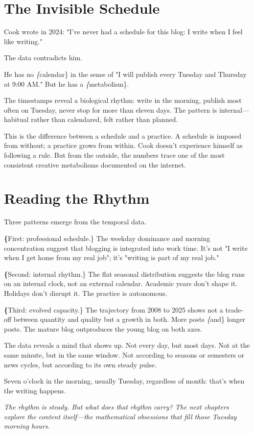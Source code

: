 \bigskip

\section*{The Invisible Schedule}

Cook wrote in 2024: "I've never had a schedule for this blog: I write when I feel like writing."

The data contradicts him.

He has no \textit\{calendar\} in the sense of "I will publish every Tuesday and Thursday at 9:00 AM." But he has a \textit\{metabolism\}.

The timestamps reveal a biological rhythm: write in the morning, publish most often on Tuesday, never stop for more than eleven days. The pattern is internal—habitual rather than calendared, felt rather than planned.

This is the difference between a schedule and a practice. A schedule is imposed from without; a practice grows from within. Cook doesn't experience himself as following a rule. But from the outside, the numbers trace one of the most consistent creative metabolisms documented on the internet.

\bigskip

\section*{Reading the Rhythm}

Three patterns emerge from the temporal data.

\textbf\{First: professional schedule.\} The weekday dominance and morning concentration suggest that blogging is integrated into work time. It's not "I write when I get home from my real job"; it's "writing is part of my real job."

\textbf\{Second: internal rhythm.\} The flat seasonal distribution suggests the blog runs on an internal clock, not an external calendar. Academic years don't shape it. Holidays don't disrupt it. The practice is autonomous.

\textbf\{Third: evolved capacity.\} The trajectory from 2008 to 2025 shows not a trade-off between quantity and quality but a growth in both. More posts \textit\{and\} longer posts. The mature blog outproduces the young blog on both axes.

The data reveals a mind that shows up. Not every day, but most days. Not at the same minute, but in the same window. Not according to seasons or semesters or news cycles, but according to its own steady pulse.

Seven o'clock in the morning, usually Tuesday, regardless of month: that's when the writing happens.

\textit{The rhythm is steady. But what does that rhythm carry? The next chapters explore the content itself—the mathematical obsessions that fill those Tuesday morning hours.}

